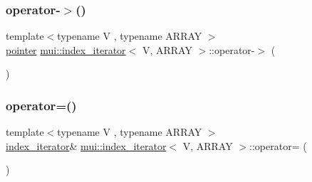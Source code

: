 \mbox{\label{structmui_1_1index__iterator_ac34c72a3ac62e28434a5cd1f4e4d0427}} 
\subsubsection{\texorpdfstring{operator-\/$>$()}{operator->()}\hspace{0.1cm}{\footnotesize\ttfamily [2/2]}}
{\footnotesize\ttfamily template$<$typename V , typename A\+R\+R\+AY $>$ \\
\hyperlink{structmui_1_1index__iterator_afbdc05d0a9403f2fb4002373c06dce97}{pointer} \hyperlink{structmui_1_1index__iterator}{mui\+::index\+\_\+iterator}$<$ V, A\+R\+R\+AY $>$\+::operator-\/$>$ (\begin{DoxyParamCaption}{ }\end{DoxyParamCaption})\hspace{0.3cm}{\ttfamily [inline]}}

\mbox{\label{structmui_1_1index__iterator_aa86f191c1d319200d0aad177bf11d49a}} 
\subsubsection{\texorpdfstring{operator=()}{operator=()}}
{\footnotesize\ttfamily template$<$typename V , typename A\+R\+R\+AY $>$ \\
\hyperlink{structmui_1_1index__iterator}{index\+\_\+iterator}\& \hyperlink{structmui_1_1index__iterator}{mui\+::index\+\_\+iterator}$<$ V, A\+R\+R\+AY $>$\+::operator= (\begin{DoxyParamCaption}\item[{const \hyperlink{structmui_1_1index__iterator}{index\+\_\+iterator}$<$ V, A\+R\+R\+AY $>$ \&}]{ }\end{DoxyParamCaption})\hspace{0.3cm}{\ttfamily [default]}}

\mbox{\label{structmui_1_1index__iterator_a9ed7f58e028b71b7b62a9174dc65e3b8}} 
